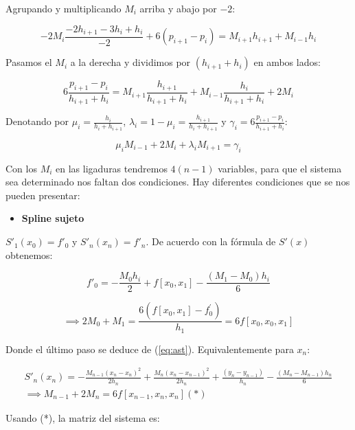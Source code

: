 \documentclass[11pt,spanish,]{article}
\theoremstyle{definition} \newtheorem*{definicion}{Definición}
\begin{document}
Agrupando y multiplicando $M_i$ arriba y abajo por $-2$:

\[-2M_i\frac{-2h_{i+1}-3h_i+h_i}{-2} + 6(p_{i+1} - p_i) =  M_{i+1}h_{i+1} + M_{i-1}h_i\]

Pasamos el $M_i$ a la derecha y dividimos por $(h_{i+1}+h_i)$ en ambos
lados:

\[6\frac{p_{i+1}-p_i}{h_{i+1}+h_i} =  M_{i+1}\frac{h_{i+1}}{h_{i+1}+h_i} + M_{i-1}\frac{h_i}{h_{i+1}+h_i} + 2M_i\]

Denotando por $\displaystyle\mu_i = \frac{h_i}{h_i+h_{i+1}}$,
$\displaystyle\lambda_i = 1-\mu_i = \frac{h_{i+1}}{h_i+h_{i+1}}$ y
$\displaystyle\gamma_i = 6\frac{p_{i+1}-p_i}{h_{i+1}+h_i}$:

\begin{equation} \label{eq:ast}
\mu_iM_{i-1} + 2M_i + \lambda_iM_{i+1} = \gamma_i
\end{equation}

Con los $M_i$ en las ligaduras tendremos $4(n-1)$ variables, para que el
sistema sea determinado nos faltan dos condiciones. Hay diferentes
condiciones que se nos pueden presentar:

\vspace*{2\baselineskip}

\begin{itemize}
\itemsep1pt\parskip0pt
\item
  \textbf{Spline sujeto}
\end{itemize}

$S'_1(x_0) = f'_0$ y $S'_n(x_n)=f'_n$. De acuerdo con la fórmula de
$S'(x)$ obtenemos:

\[f'_0 = -\frac{M_0h_i}{2} + f[x_0,x_1] - \frac{(M_1 - M_0)h_i}{6} \]

\[\implies  2M_0+M_1=\frac{6(f{[x_0,x_1]} - f^{'}_0)}{h_1} = 6f{[x_0,x_0,x_1]}\]

Donde el último paso se deduce de (\ref{eq:ast}). Equivalentemente para
$x_n$:

\begin{multline*}
S'_n(x_n) = - \frac{M_{n-1}(x_n-x_n)^2}{2h_n} + \frac{M_n(x_n-x_{n-1})^2}{2h_n} + \frac{(y_n-y_{n-1})}{h_n} - \frac{(M_n-M_{n-1})h_n}{6} \\
\implies
M_{n-1}+2M_n=6f[x_{n-1},x_n,x_n] (*)
\end{multline*}

Usando (*), la matriz del sistema es:
\end{document}
